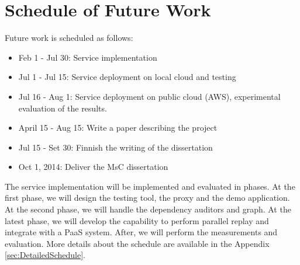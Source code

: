 \section{Schedule of Future Work}
\label{sec:Schedule}

Future work is scheduled as follows:
\begin{itemize}
  \item Feb 1 - Jul 30: Service implementation
  \item Jul 1 - Jul 15: Service deployment on local cloud and testing
  \item Jul 16 - Aug 1: Service deployment on public cloud (AWS), experimental evaluation of the results.
  \item April 15 - Aug 15: Write a paper describing the project
  \item Jul 15 - Set 30: Finnish the writing of the dissertation
  \item Oct 1, 2014: Deliver the MsC dissertation
\end{itemize}

The service implementation will be implemented and evaluated in phases. At the first phase, we will design the testing tool, the proxy and the demo application. At the second phase, we will handle the dependency auditors and graph. At the latest phase, we will develop the capability to perform parallel replay and integrate with a PaaS system. After, we will perform the measurements and evaluation. More details about the schedule are available in the Appendix \ref{sec:DetailedSchedule}.


